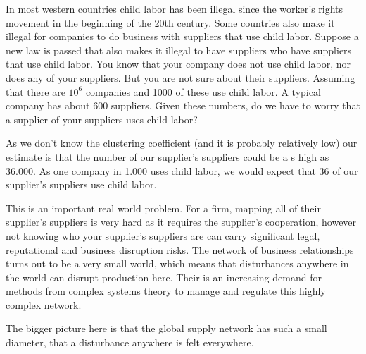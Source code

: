 
In most western countries child labor has been illegal since the worker's rights movement in the beginning of the 20th century. Some countries also make it illegal for companies to do business with suppliers that use child labor. Suppose a new law is passed that also makes it illegal to have suppliers who have suppliers that use child labor. You know that your company does not use child labor, nor does any of your suppliers. But you are not sure about their suppliers. Assuming that there are $10^6$ companies and 1000 of these use child labor. A typical company has about 600 suppliers. Given these numbers, do we have to worry that a supplier of your suppliers uses child labor?

\solution
As we don't know the clustering coefficient (and it is probably relatively low) our estimate is that the number of our supplier's suppliers could be a s high as 36.000. As one company in 1.000 uses child labor, we would expect that 36 of our supplier's suppliers use child labor. 

This is an important real world problem. For a firm, mapping all of their supplier's suppliers is very hard as it requires the supplier's cooperation, however not knowing who your supplier's suppliers are can carry significant legal, reputational and business disruption risks. The network of business relationships turns out to be a very small world, which means that disturbances anywhere in the world can disrupt production here. Their is an increasing demand for methods from complex systems theory to manage and regulate this highly complex network. 

The bigger picture here is that the global supply network has such a small diameter, that a disturbance anywhere is felt everywhere. 
